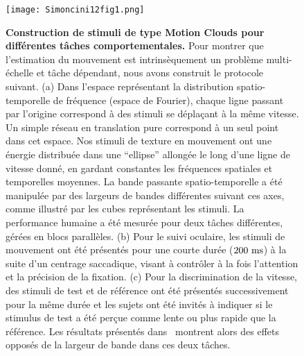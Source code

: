 \begin{figure}%
\centerline{\texttt{[image: Simoncini12fig1.png]}}
\caption{\textbf{Construction de stimuli de type Motion Clouds pour différentes tâches comportementales.} Pour montrer que l'estimation du mouvement est intrinsèquement un problème multi-échelle et tâche dépendant, nous avons construit le protocole suivant. (a) Dans l'espace représentant la distribution spatio-temporelle de fréquence (espace de Fourier), chaque ligne passant par l'origine correspond à des stimuli se déplaçant à la même vitesse. Un simple réseau en translation pure correspond à un seul point dans cet espace. Nos stimuli de texture en mouvement ont une énergie distribuée dans une ``ellipse''  allongée le long d'une ligne de vitesse donné, en gardant constantes les fréquences spatiales et temporelles moyennes. La bande passante spatio-temporelle a été manipulée par des largeurs de bandes différentes suivant ces axes, comme illustré par les cubes représentant les stimuli. La performance humaine a été mesurée pour deux tâches différentes, gérées en blocs parallèles. (b) Pour le suivi oculaire, les stimuli de mouvement ont été présentés pour une courte durée ($200~\si{\milli\second}$) à la suite d'un centrage saccadique, visant à contrôler à la fois l'attention et la précision de la fixation. (c) Pour la discrimination de la vitesse, des stimuli de test et de référence ont été présentés successivement pour la même durée et les sujets ont été invités à indiquer si le stimulus de test a été perçue comme lente ou plus rapide que la référence. Les résultats présentés dans~\citep{Simoncini12} montrent alors des effets opposés de la largeur de bande dans ces deux tâches. %
}%
\label{fig:simoncini12}%
\end{figure}%

